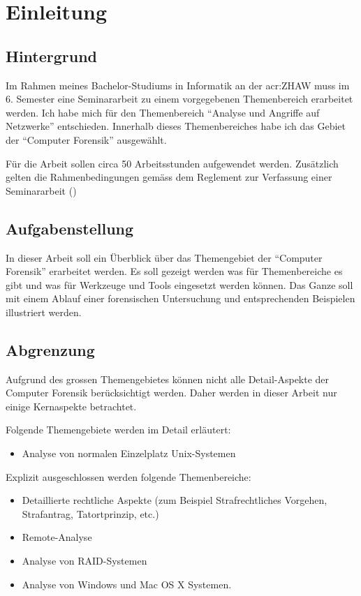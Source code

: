 
\chapter{Einleitung}


\section{Hintergrund}
Im Rahmen meines Bachelor-Studiums in Informatik an der \gls{acr:ZHAW} muss im 6. Semester eine Seminararbeit zu einem vorgegebenen Themenbereich erarbeitet werden. Ich habe mich für den Themenbereich "`Analyse und Angriffe auf Netzwerke"' entschieden. Innerhalb dieses Themenbereiches habe ich das Gebiet der "`Computer Forensik"' ausgewählt.

Für die Arbeit sollen circa 50 Arbeitsstunden aufgewendet werden. Zusätzlich gelten die Rahmenbedingungen gemäss dem Reglement zur Verfassung einer Seminararbeit (\cite{ZHAW:2012:Seminararbeit:Reglemente})

\section{Aufgabenstellung}
In dieser Arbeit soll ein Überblick über das Themengebiet der "`Computer Forensik"' erarbeitet werden. Es soll gezeigt werden was für Themenbereiche es gibt und was für Werkzeuge und Tools eingesetzt werden können. Das Ganze soll mit einem Ablauf einer forensischen Untersuchung und entsprechenden Beispielen illustriert werden.

\section{Abgrenzung}
Aufgrund des grossen Themengebietes können nicht alle Detail-Aspekte der Computer Forensik berücksichtigt werden. Daher werden in dieser Arbeit nur einige Kernaspekte betrachtet. 

Folgende Themengebiete werden im Detail erläutert:
\begin{itemize}
\item Analyse von normalen Einzelplatz Unix-Systemen
\end{itemize}

Explizit ausgeschlossen werden folgende Themenbereiche:

\begin{itemize}
\item Detaillierte rechtliche Aspekte (zum Beispiel Strafrechtliches Vorgehen, Strafantrag, Tatortprinzip, etc.)
\item Remote-Analyse
\item Analyse von RAID-Systemen
\item Analyse von Windows und Mac OS X Systemen.
\end{itemize}

